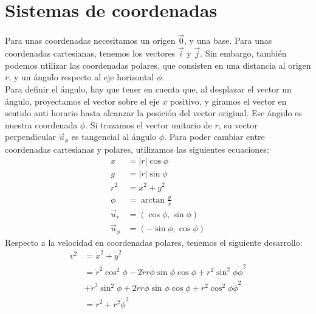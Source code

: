 \documentclass{../FisicaII.tex}
\begin{document}
\section{Sistemas de coordenadas}
Para unas coordenadas necesitamos un origen $\vec{0}$, y una base. Para unas coordenadas cartesianas, tenemos los vectores $\vec{i}$ y $\vec{j}$. Sin embargo, también podemos utilizar las coordenadas polares, que consisten en una distancia al origen $r$, y un ángulo respecto al eje horizontal $\phi$.\\
Para definir el ángulo, hay que tener en cuenta que, al desplazar el vector un ángulo, proyectamos el vector sobre el eje $x$ positivo, y giramos el vector en sentido anti horario hasta alcanzar la posición del vector original. Ese ángulo es nuestra coordenada $\phi$.
Si trazamos el vector unitario de $r$, su vector perpendicular $\vec{u}_{\phi}$ es tangencial al ángulo $\phi$.
Para poder cambiar entre coordenadas cartesianas y polares, utilizamos las siguientes ecuaciones:
\begin{equation}
	\begin{split}
		x &= |r|\cos \phi\\ y &= |r|\sin \phi\\r^{2}&= x^{2}+y^{2} \\
\phi &= \arctan \frac{y}{x}\\
\vec{u}_{r} &= (\cos \phi, \sin \phi) \\
\vec{u}_{\phi} &= (-\sin \phi, \cos \phi)
	\end{split}
\end{equation}
Respecto a la velocidad en coordenadas polares, tenemos el siguiente desarrollo:
\begin{equation}
	\begin{split}
		v^{2}&=\dot{x}^{2}+\dot{y}^{2} \\
&=\dot{r}^{2}\cos ^{2}\phi-2\dot{r} r \dot{\phi}\sin \phi \cos \phi+r^{2}\sin ^{2}\phi
\dot{\phi}^{2} \\
&+\dot{r}^{2}\sin ^{2}\phi+2 \dot{r}r \dot{\phi}\sin \phi \cos \phi+ r^{2}\cos ^{2}\phi \dot{\phi}^{2} \\
&= \dot{r}^{2}+r^{2} \dot{\phi}^{2}
	\end{split}
\end{equation}
\end{document}
